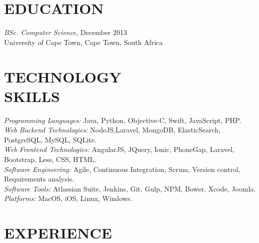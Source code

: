 \documentclass[margin, 10pt]{res} %
\begin{document}
\begin{resume}



\section{EDUCATION}

{\sl BSc. Computer Science,}  \hfill December 2013 \\
University of Cape Town, Cape Town, South Africa\\
 


\section{TECHNOLOGY \\ SKILLS} 

{\sl Programming Languages:} Java, Python, Objective-C, Swift, JavaScript, PHP. \\
{\sl Web Backend Technologies:}  NodeJS,Laravel, MongoDB, ElasticSearch, PostgreSQL, MySQL, SQLite. \\
{\sl Web Frontend Technologies:} AngularJS, JQuery, Ionic, PhoneGap, Laravel, Bootstrap, Less, CSS, HTML. \\
{\sl Software Engineering:} Agile, Continuous Integration, Scrum, Version control, Requirements analysis. \\
{\sl Software Tools:} Atlassian Suite, Jenkins, Git, Gulp, NPM, Bower, Xcode, Joomla. \\
{\sl Platforms:} MacOS, iOS, Linux, Windows. \\
 
 
\section{EXPERIENCE}


\end{resume}
\end{document}
